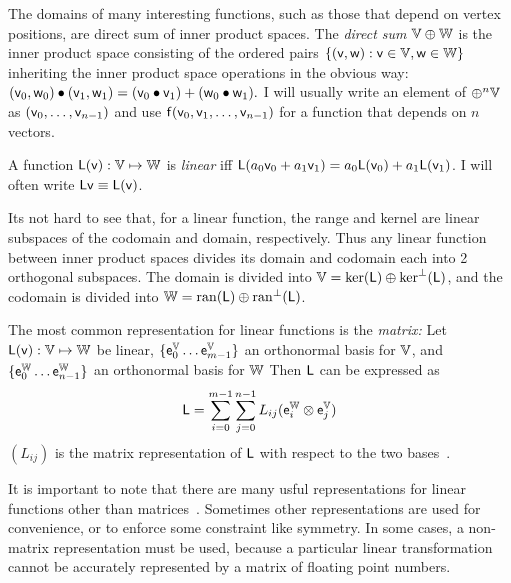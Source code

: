 The domains of many interesting functions,
such as those that depend on vertex positions,
are direct sum of inner product spaces.
The \textit{direct sum} $\mathbb{V} \oplus \mathbb{W}$ is the inner product space
consisting of the ordered pairs $\{ (\mathsf{v},\mathsf{w}) : \mathsf{v} \in \mathbb{V}, \mathsf{w} \in \mathbb{W} \}$
inheriting the inner product space operations in the obvious way:
$(\mathsf{v}_0,\mathsf{w}_0) \bullet (\mathsf{v}_1,\mathsf{w}_1) = (\mathsf{v}_0 \bullet \mathsf{v}_1) + (\mathsf{w}_0 \bullet \mathsf{w}_1).$
I will usually write an element of $\oplus^n \mathbb{V}$ as
$(\mathsf{v}_0,\ldots,\mathsf{v}_{n-1})$
and use
$\mathsf{f}(\mathsf{v}_0,\mathsf{v}_1,\ldots,\mathsf{v}_{n-1})$
for a function that depends on $n$ vectors.

\label{sec:linear-functions}

A function $\mathsf{L}(\mathsf{v}):\mathbb{V} \mapsto \mathbb{W}$
is \textit{linear} iff
$\mathsf{L}(a_0 \mathsf{v}_0 + a_1 \mathsf{v}_1) = a_0 \mathsf{L}(\mathsf{v}_0) + a_1 \mathsf{L}(\mathsf{v}_1)$.
I will often write $\mathsf{L}\mathsf{v} \equiv \mathsf{L}(\mathsf{v})$.

Its not hard to see that, for a linear function,
the range and kernel are linear subspaces of the codomain and
domain, respectively.
Thus any linear function between inner product spaces
divides its domain and codomain each into 2 orthogonal subspaces.
The domain is divided into $\mathbb{V} = \mathrm{ker}(\mathsf{L}) \oplus \mathrm{ker}^{\perp}(\mathsf{L})$,
and the codomain is divided into $\mathbb{W} = \mathrm{ran}(\mathsf{L}) \oplus \mathrm{ran}^{\perp}(\mathsf{L})$.

The most common representation for linear functions is the \textit{matrix:}
Let $\mathsf{L}(\mathsf{v}):\mathbb{V} \mapsto \mathbb{W}$ be linear,
$\{ \mathsf{e}_0^{\mathbb{V}} \ldots  \mathsf{e}_{m-1}^{\mathbb{V}} \}$ an orthonormal basis for $\mathbb{V}$,
and
$\{ \mathsf{e}_0^{\mathbb{W}} \ldots \mathsf{e}_{n-1}^{\mathbb{W}} \}$ an orthonormal  basis for $\mathbb{W}$
Then $\mathsf{L}$ can be expressed as
\begin{equation}
\mathsf{L}
 =
\sum_{i=0}^{m-1} \sum_{j=0}^{n-1} L_{ij} ( \mathsf{e}_i^{\mathbb{W}} \otimes \mathsf{e}_j^{\mathbb{V}} )
\end{equation}
$(L_{ij})$ is the matrix representation of $\mathsf{L}$ with respect to
the two bases~\cite{halmos-1958}.

It is important to note that there are many usful
representations for linear functions other than 
matrices~\cite{mcdonald-1989b}.
Sometimes other representations are used for convenience,
or to enforce some constraint like symmetry.
In some cases, a non-matrix representation must be used,
because a particular linear transformation
cannot be accurately represented by a matrix of floating point numbers.

